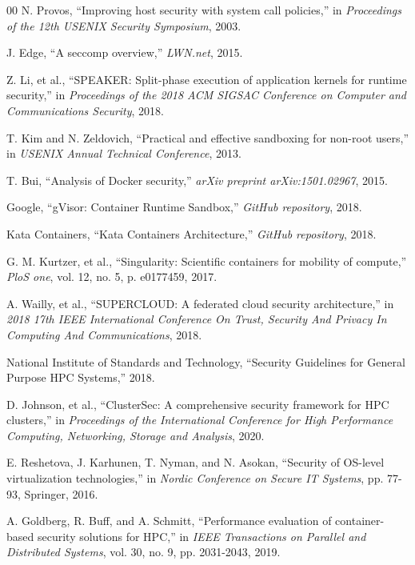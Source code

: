 
\begin{thebibliography}{00}
 N. Provos, ``Improving host security with system call policies,'' in \textit{Proceedings of the 12th USENIX Security Symposium}, 2003.

 J. Edge, ``A seccomp overview,'' \textit{LWN.net}, 2015.

 Z. Li, et al., ``SPEAKER: Split-phase execution of application kernels for runtime security,'' in \textit{Proceedings of the 2018 ACM SIGSAC Conference on Computer and Communications Security}, 2018.

 T. Kim and N. Zeldovich, ``Practical and effective sandboxing for non-root users,'' in \textit{USENIX Annual Technical Conference}, 2013.

 T. Bui, ``Analysis of Docker security,'' \textit{arXiv preprint arXiv:1501.02967}, 2015.

 Google, ``gVisor: Container Runtime Sandbox,'' \textit{GitHub repository}, 2018.

 Kata Containers, ``Kata Containers Architecture,'' \textit{GitHub repository}, 2018.

 G. M. Kurtzer, et al., ``Singularity: Scientific containers for mobility of compute,'' \textit{PloS one}, vol. 12, no. 5, p. e0177459, 2017.

 A. Wailly, et al., ``SUPERCLOUD: A federated cloud security architecture,'' in \textit{2018 17th IEEE International Conference On Trust, Security And Privacy In Computing And Communications}, 2018.

 National Institute of Standards and Technology, ``Security Guidelines for General Purpose HPC Systems,'' 2018.

 D. Johnson, et al., ``ClusterSec: A comprehensive security framework for HPC clusters,'' in \textit{Proceedings of the International Conference for High Performance Computing, Networking, Storage and Analysis}, 2020.

 E. Reshetova, J. Karhunen, T. Nyman, and N. Asokan, ``Security of OS-level virtualization technologies,'' in \textit{Nordic Conference on Secure IT Systems}, pp. 77-93, Springer, 2016.

 A. Goldberg, R. Buff, and A. Schmitt, ``Performance evaluation of container-based security solutions for HPC,'' in \textit{IEEE Transactions on Parallel and Distributed Systems}, vol. 30, no. 9, pp. 2031-2043, 2019.


\end{thebibliography}
